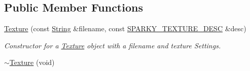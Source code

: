 \subsection*{Public Member Functions}
\begin{DoxyCompactItemize}
\item 
\hyperlink{classsparky_1_1_texture_aa4d414b3e015de45973399d3765ea900}{Texture} (const \hyperlink{classsparky_1_1_string}{String} \&filename, const \hyperlink{structsparky_1_1_s_p_a_r_k_y___t_e_x_t_u_r_e___d_e_s_c}{S\+P\+A\+R\+K\+Y\+\_\+\+T\+E\+X\+T\+U\+R\+E\+\_\+\+D\+E\+SC} \&desc)
\begin{DoxyCompactList}\small\item\em Constructor for a \hyperlink{classsparky_1_1_texture}{Texture} object with a filename and texture Settings. \end{DoxyCompactList}\item 
\hyperlink{classsparky_1_1_texture_afcefbc71a6f666bb0ad3d418d88f1667}{$\sim$\+Texture} (void)\hypertarget{classsparky_1_1_texture_afcefbc71a6f666bb0ad3d418d88f1667}{}\label{classsparky_1_1_texture_afcefbc71a6f666bb0ad3d418d88f1667}


\end{DoxyCompactItemize}

